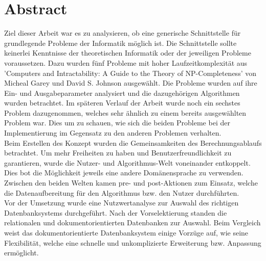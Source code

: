 %
%

\thispagestyle{empty}


\newpage
\thispagestyle{empty}
\chapter*{Abstract}\label{abstract}
Ziel dieser Arbeit war es zu analysieren, ob eine generische Schnittstelle für grundlegende Probleme der Informatik möglich ist. Die Schnittstelle sollte keinerlei Kenntnisse 
der theoretischen Informatik oder der jeweiligen Probleme voraussetzen. Dazu wurden fünf Probleme mit hoher Laufzeitkomplexität aus 'Computers and Intractability: A Guide to the Theory of 
NP-Completeness' von Micheal Garey und David S. Johnson ausgewählt.  Die Probleme wurden auf ihre Ein- und Ausgabeparameter analysiert und die dazugehörigen 
Algorithmen wurden betrachtet. Im späteren Verlauf der Arbeit wurde noch ein sechstes Problem dazugenommen, welches sehr ähnlich zu einem bereits ausgewählten Problem war. Dies 
um zu schauen, wie sich die beiden Probleme bei der Implementierung im Gegensatz zu den anderen Problemen verhalten.\\

Beim Erstellen des Konzept wurden die Gemeinsamkeiten des Berechnungsablaufs betrachtet. Um mehr Freiheiten zu haben und Benutzerfreundlichkeit zu garantieren, wurde die Nutzer- und 
Algorithmus-Welt voneinander entkoppelt. Dies bot die Möglichkeit jeweils eine andere Domänensprache zu verwenden. Zwischen den beiden Welten kamen pre- und post-Aktionen zum Einsatz, 
welche die Datenaufbereitung für den Algorithmus bzw. den Nutzer durchführten.\\

Vor der Umsetzung wurde eine Nutzwertanalyse zur Auswahl des richtigen Datenbanksystems durchgeführt. Nach der Vorselektierung standen die relationalen und dokumentorientierten 
Datenbanken zur Auswahl. Beim Vergleich weist das dokumentorientierte Datenbanksystem einige Vorzüge auf, wie seine Flexibilität, welche eine schnelle und unkomplizierte Erweiterung bzw. 
Anpassung ermöglicht.\\

